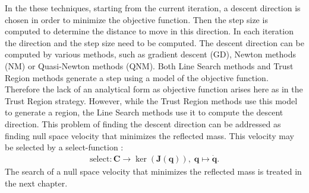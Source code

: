 In the these techniques, starting from the current iteration, a descent direction is chosen in order to minimize the objective function. Then the step size is computed to determine the distance to move in this direction. In each iteration the direction and the step size need to be computed. The descent direction can be computed by various methods, such as gradient descent (GD), Newton methods (NM) or Quasi-Newton methods (QNM). %
Both Line Search methods and Trust Region methods generate a step using a model of the objective function. Therefore the lack of an analytical form as objective function arises here as in the Trust Region strategy.
However, while the Trust Region methods use this model to generate a region, the Line Search methods use it to compute the descent direction.  
This problem of finding the descent direction can be addressed as finding null space velocity that minimizes the reflected mass. This velocity may be selected by a  select-function :
%
\begin{align}
\text{select}: \mathbf{C}\rightarrow\ker(\mathbf{J}(\mathbf{q})),\; \mathbf{q}\mapsto\dot{\mathbf{q}} .
\end{align}
%
 The search of a null space velocity that minimizes the reflected mass is treated in the next chapter. 








